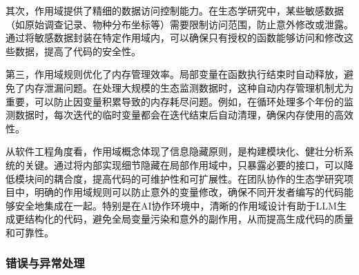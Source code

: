 \documentclass[
]{book}
\begin{document}
其次，作用域提供了精细的数据访问控制能力。在生态学研究中，某些敏感数据（如原始调查记录、物种分布坐标等）需要限制访问范围，防止意外修改或泄露。通过将敏感数据封装在特定作用域内，可以确保只有授权的函数能够访问和修改这些数据，提高了代码的安全性。

第三，作用域规则优化了内存管理效率。局部变量在函数执行结束时自动释放，避免了内存泄漏问题。在处理大规模的生态监测数据时，这种自动内存管理机制尤为重要，可以防止因变量积累导致的内存耗尽问题。例如，在循环处理多个年份的监测数据时，每次迭代的临时变量都会在迭代结束后自动清理，确保内存使用的高效性。

从软件工程角度看，作用域概念体现了信息隐藏原则，是构建模块化、健壮分析系统的关键。通过将内部实现细节隐藏在局部作用域中，只暴露必要的接口，可以降低模块间的耦合度，提高代码的可维护性和可扩展性。在团队协作的生态学研究项目中，明确的作用域规则可以防止意外的变量修改，确保不同开发者编写的代码能够安全地集成在一起。特别是在AI协作环境中，清晰的作用域设计有助于LLM生成更结构化的代码，避免全局变量污染和意外的副作用，从而提高生成代码的质量和可靠性。

\hypertarget{ux9519ux8befux4e0eux5f02ux5e38ux5904ux7406}{%
\subsubsection{错误与异常处理}\label{ux9519ux8befux4e0eux5f02ux5e38ux5904ux7406}}
\end{document}
